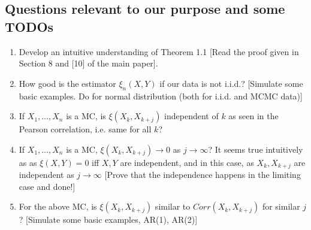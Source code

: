 \subsection{Questions relevant to our purpose and some TODOs}
\begin{enumerate}
    \item Develop an intuitive understanding of Theorem 1.1 [Read the proof given in Section 8 and [10] of the main paper].
    \item How good is the estimator $\xi_n(X, Y)$ if our data is not i.i.d.? [Simulate some basic examples. Do for normal distribution (both for i.i.d. and MCMC data)]
    \item If $X_1, \dots, X_n$ is a MC, is $\xi(X_k, X_{k+j})$ independent of $k$ as seen in the Pearson correlation, i.e. same for all $k$? 
    \item If $X_1, \dots, X_n$ is a MC, $\xi(X_k, X_{k+j}) \rightarrow 0$ as $j \rightarrow \infty$? It seems true intuitively as as $\xi(X, Y) = 0$ iff $X, Y$ are independent, and in this case, as $X_k, X_{k+j}$ are independent as $j \rightarrow \infty$ [Prove that the independence happens in the limiting case and done!]
    \item For the above MC, is $\xi(X_k, X_{k+j})$ similar to $Corr(X_k, X_{k+j})$ for similar $j$? [Simulate some basic examples, AR(1), AR(2)]
\end{enumerate}

